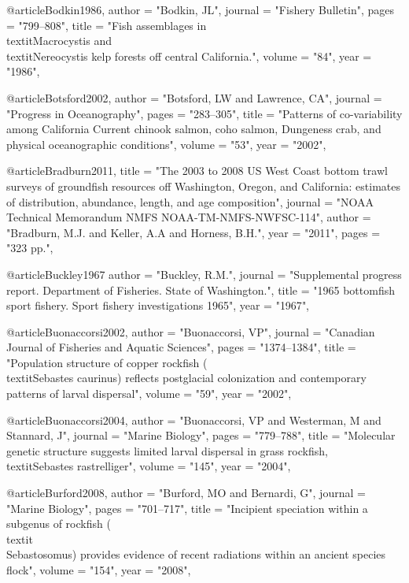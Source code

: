 @article{Bodkin1986,
    author = "{Bodkin, JL}",
    journal = "{Fishery Bulletin}",
    pages = "{799--808}",
    title = "{{Fish assemblages in \\textit{Macrocystis} and \\textit{Nereocystis} kelp forests off central California.}}",
    volume = "{84}",
    year = "{1986}",
}

@article{Botsford2002,
    author = "{Botsford, LW and Lawrence, CA}",
    journal = "{Progress in Oceanography}",
    pages = "{283--305}",
    title = "{{Patterns of co-variability among California Current chinook salmon, coho salmon, Dungeness crab, and physical oceanographic conditions}}",
    volume = "{53}",
    year = "{2002}",
}

@article{Bradburn2011,
    title = "{The 2003 to 2008 {US} {West} {Coast} bottom trawl surveys of groundfish resources off {Washington}, {Oregon}, and {California}: estimates of distribution, abundance, length, and age composition}",
    journal = "{NOAA Technical Memorandum NMFS NOAA-TM-NMFS-NWFSC-114}",
    author = "{Bradburn, M.J. and Keller, A.A and Horness, B.H.}",
    year = "{2011}",
    pages = "{323 pp.}",
}

@article{Buckley1967
    author = "{Buckley, R.M.}",
    journal = "{Supplemental progress report. Department of Fisheries. State of Washington.}",
    title = "{{1965 bottomfish sport fishery. Sport fishery investigations 1965}}",
    year = "{1967}",
}

@article{Buonaccorsi2002,
    author = "{Buonaccorsi, VP}",
    journal = "{Canadian Journal of Fisheries and Aquatic Sciences}",
    pages = "{1374--1384}",
    title = "{{Population structure of copper rockfish (\\textit{{Sebastes} caurinus}) reflects postglacial colonization and contemporary patterns of larval dispersal}}",
    volume = "{59}",
    year = "{2002}",
}

@article{Buonaccorsi2004,
    author = "{Buonaccorsi, VP and Westerman, M and Stannard, J}",
    journal = "{Marine Biology}",
    pages = "{779--788}",
    title = "{{Molecular genetic structure suggests limited larval dispersal in grass rockfish, \\textit{{Sebastes} rastrelliger}}}",
    volume = "{145}",
    year = "{2004}",
}

@article{Burford2008,
    author = "{Burford, MO and Bernardi, G}",
    journal = "{Marine Biology}",
    pages = "{701--717}",
    title = "{{Incipient speciation within a subgenus of rockfish (\\textit\\{Sebastosomus}) provides evidence of recent radiations within an ancient species flock}}",
    volume = "{154}",
    year = "{2008}",
}

